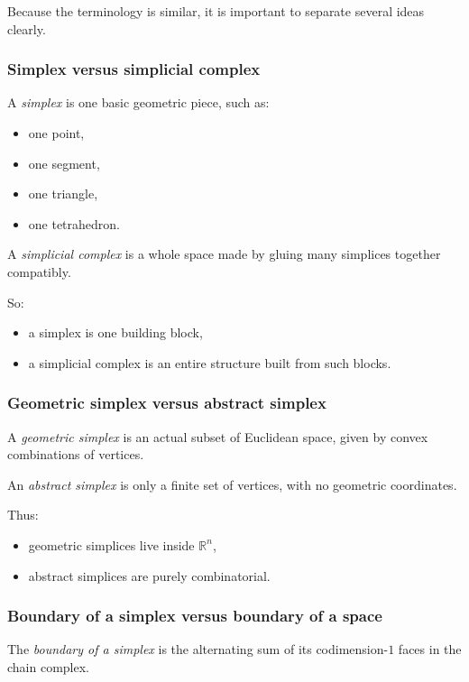 \documentclass[12pt,a4paper]{article}
\theoremstyle{notespace}
\begin{document}
Because the terminology is similar, it is important to separate several ideas clearly.

\subsubsection{Simplex versus simplicial complex}

A \emph{simplex} is one basic geometric piece, such as:
\begin{itemize}
	\item one point,
	\item one segment,
	\item one triangle,
	\item one tetrahedron.
\end{itemize}

A \emph{simplicial complex} is a whole space made by gluing many simplices together compatibly.

So:
\begin{itemize}
	\item a simplex is one building block,
	\item a simplicial complex is an entire structure built from such blocks.
\end{itemize}

\subsubsection{Geometric simplex versus abstract simplex}

A \emph{geometric simplex} is an actual subset of Euclidean space, given by convex combinations of vertices.

An \emph{abstract simplex} is only a finite set of vertices, with no geometric coordinates.

Thus:
\begin{itemize}
	\item geometric simplices live inside \(\mathbb{R}^n\),
	\item abstract simplices are purely combinatorial.
\end{itemize}

\subsubsection{Boundary of a simplex versus boundary of a space}

The \emph{boundary of a simplex} is the alternating sum of its codimension-\(1\) faces in the chain complex.
\end{document}
